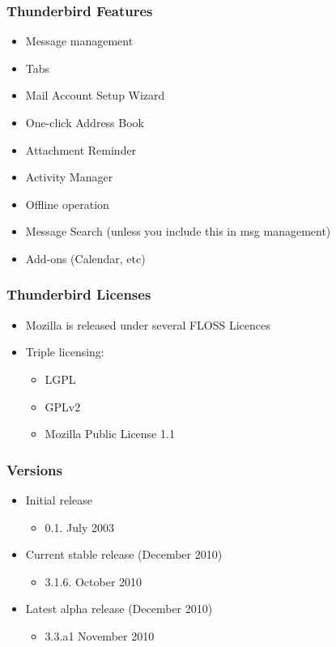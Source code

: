 \documentclass{beamer}
\begin{document}
\begin{frame}
 \frametitle{Thunderbird Features}
 \begin{itemize}
 \item Message management
 \item Tabs
 \item Mail Account Setup Wizard
 \item One-click Address Book
 \item Attachment Reminder
 \item Activity Manager
 \item Offline operation
 \item Message Search (unless you include this in msg management)
 \item Add-ons (Calendar, etc)
 \end{itemize}
\end{frame}


\begin{frame}
 \frametitle{Thunderbird Licenses}
 \begin{itemize}
 \item Mozilla is released under several FLOSS Licences
 \item Triple licensing:
    \begin{itemize}
     \item LGPL
     \item GPLv2
     \item Mozilla Public License 1.1
    \end{itemize}

 \end{itemize}
\end{frame}


\begin{frame}
 \frametitle{Versions}
 \begin{itemize}
 \item Initial release
    \begin{itemize}
     \item 0.1. July 2003
    \end{itemize}

 \item Current stable release (December 2010)
    \begin{itemize}
     \item 3.1.6. October 2010
    \end{itemize}

 \item Latest alpha release (December 2010)
    \begin{itemize}
     \item 3.3.a1 November 2010
    \end{itemize}

 \end{itemize}
\end{frame}
\end{document}
